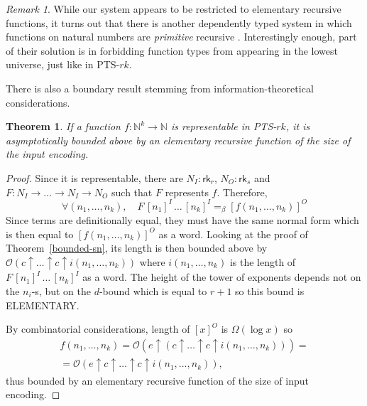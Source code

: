 \documentclass{article}
\newtheorem{theorem}{Theorem}
\theoremstyle{definition}
\theoremstyle{remark}
\newtheorem*{remark}{Remark}
\begin{document}
\begin{remark}
    While our system appears to be restricted to
    elementary recursive functions, it turns out that
    there is another dependently typed system in which
    functions on natural numbers are \emph{primitive}
    recursive \cite{buchholtz2024primitive}.
    Interestingly enough, part of their solution is in
    forbidding function types from appearing in the
    lowest universe, just like in PTS-$rk$.
\end{remark}

There is also a boundary result stemming from
information-theoretical considerations.

\begin{theorem}\label{rep-bound}
    If a function $f:\mathbb{N}^k\to\mathbb{N}$ is
    representable in PTS-$rk$, it is asymptotically
    bounded above by an elementary recursive function
    of the size of the input encoding.
\end{theorem}
\begin{proof}
    Since it is representable, there are
    $N_I:\mathsf{rk}_r$, $N_O:\mathsf{rk}_s$ and
    $F:N_I\to\ldots\to N_I\to N_O$ such that $F$
    represents $f$. Therefore,
    \[
        \forall(n_1,\ldots,n_k),\quad
        F\,[n_1]^I\,\ldots\,[n_k]^I=_\beta
        [f(n_1,\ldots,n_k)]^O
    \]
    Since terms are definitionally equal, they must
    have the same normal form which is then equal to
    $[f(n_1,\ldots,n_k)]^O$ as a word. Looking at the
    proof of Theorem~\ref{bounded-sn}, its length is
    then bounded above by
    $\mathcal{O}(c\uparrow\ldots\uparrow c\uparrow
    i(n_1,\ldots,n_k))$ where $i(n_1,\ldots,n_k)$ is
    the length of $F\,[n_1]^I\,\ldots\,[n_k]^I$ as a
    word. The height of the tower of exponents depends
    not on the $n_i$-s, but on the $d$-bound which is
    equal to $r+1$ so this bound is
    \textsc{ELEMENTARY}.

    By combinatorial considerations, length of $[x]^O$
    is $\Omega(\log{x})$ so
    \begin{multline*}
        f(n_1,\ldots,n_k)=\mathcal{O}(e\uparrow\left(c
        \uparrow\ldots\uparrow c\uparrow i(n_1,\ldots,
        n_k)\right))
        =\\=\mathcal{O}(e\uparrow c\uparrow\ldots
        \uparrow c\uparrow i(n_1,\ldots,n_k)),
    \end{multline*}
    thus bounded by an elementary recursive function of
    the size of input encoding.
\end{proof}
\end{document}
